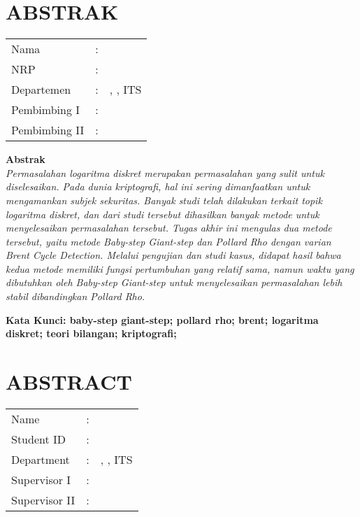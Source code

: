 \chapter {ABSTRAK}


\noindent\textbf{\MakeUppercase\judul}
\vspace*{1em}

\begin{tabularx}{\linewidth}{ l l X }
	Nama 			& : & \penulis \\
	NRP 			& :	& \nrplama \\
	Departemen 		& : & \jurusanlama, \newline \fakultaslama, ITS \\
	Pembimbing I 	& : & \pembimbingsatu \\
	Pembimbing II 	& : & \pembimbingdua
	\vspace*{1em} 	%
\end {tabularx}

\noindent\textbf{Abstrak} \\
\itshape
Permasalahan logaritma diskret merupakan permasalahan yang sulit untuk diselesaikan. Pada dunia kriptografi, hal ini sering dimanfaatkan untuk mengamankan subjek sekuritas. Banyak studi telah dilakukan terkait topik logaritma diskret, dan dari studi tersebut dihasilkan banyak metode untuk menyelesaikan permasalahan tersebut. Tugas akhir ini mengulas dua metode tersebut, yaitu metode Baby-step Giant-step dan Pollard Rho dengan varian Brent Cycle Detection. Melalui pengujian dan studi kasus, didapat hasil bahwa kedua metode memiliki fungsi pertumbuhan yang relatif sama, namun waktu yang dibutuhkan oleh Baby-step Giant-step untuk menyelesaikan permasalahan lebih stabil dibandingkan Pollard Rho.

\vspace*{1em}
\noindent\bfseries Kata Kunci: baby-step giant-step; pollard rho; brent; logaritma diskret; teori bilangan; kriptografi;
\normalfont
\cleardoublepage

\chapter {ABSTRACT}
\noindent\textbf{\MakeUppercase\juduleng}
\vspace*{1em}

\begin{tabularx}{\linewidth}{ l l X }
	Name 			& : & \penulis \\
	Student ID		& :	& \nrplama \\
	Department 		& : & \jurusanlamaeng, \newline \fakultaslamaeng, ITS \\
	Supervisor I 	& : & \pembimbingsatu \\
	Supervisor II 	& : & \pembimbingdua
	\vspace*{1em} 	%
\end {tabularx}
	
